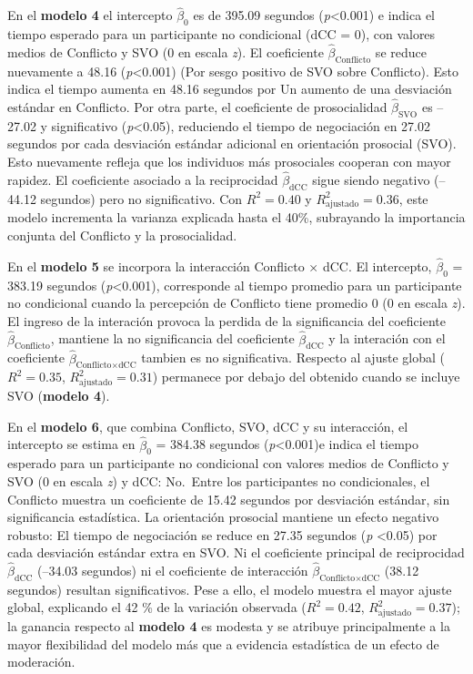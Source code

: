 \documentclass[
  spanish,
  10pt,
]{article}
\begin{document}
En el \textbf{modelo 4} el intercepto \(\hat{\beta}_0\) es de 395.09
segundos (\emph{p}\textless0.001) e indica el tiempo esperado para un
participante no condicional (dCC = 0), con valores medios de Conflicto y
SVO (0 en escala \emph{z}). El coeficiente
\(\hat{\beta}_{\text{Conflicto}}\) se reduce nuevamente a 48.16
(\emph{p}\textless0.001) (Por sesgo positivo de SVO sobre Conflicto).
Esto indica el tiempo aumenta en 48.16 segundos por Un aumento de una
desviación estándar en Conflicto. Por otra parte, el coeficiente de
prosocialidad \(\hat{\beta}_{\text{SVO}}\) es --27.02 y significativo
(\emph{p}\textless0.05), reduciendo el tiempo de negociación en 27.02
segundos por cada desviación estándar adicional en orientación prosocial
(SVO). Esto nuevamente refleja que los individuos más prosociales
cooperan con mayor rapidez. El coeficiente asociado a la reciprocidad
\(\hat{\beta}_{\text{dCC}}\) sigue siendo negativo (--44.12 segundos)
pero no significativo. Con \(R^2 = 0.40\) y
\(R^2_{\text{ajustado}} = 0.36\), este modelo incrementa la varianza
explicada hasta el 40\%, subrayando la importancia conjunta del
Conflicto y la prosocialidad.

En el \textbf{modelo 5} se incorpora la interacción Conflicto × dCC. El
intercepto, \(\hat{\beta}_0\) = 383.19 segundos
(\emph{p}\textless0.001), corresponde al tiempo promedio para un
participante no condicional cuando la percepción de Conflicto tiene
promedio 0 (0 en escala \emph{z}). El ingreso de la interación provoca
la perdida de la significancia del coeficiente
\(\hat{\beta}_{\text{Conflicto}}\), mantiene la no significancia del
coeficiente \(\hat{\beta}_{\text{dCC}}\) y la interación con el
coeficiente \(\hat{\beta}_{\text{Conflicto} \times \text{dCC}}\) tambien
es no significativa. Respecto al ajuste global (\(R^2 = 0.35\),
\(R^2_{\text{ajustado}} = 0.31\)) permanece por debajo del obtenido
cuando se incluye SVO (\textbf{modelo 4}).

En el \textbf{modelo 6}, que combina Conflicto, SVO, dCC y su
interacción, el intercepto se estima en \(\hat{\beta}_0\) = 384.38
segundos (\emph{p}\textless0.001)e indica el tiempo esperado para un
participante no condicional con valores medios de Conflicto y SVO (0 en
escala \emph{z}) y dCC: No.~Entre los participantes no condicionales, el
Conflicto muestra un coeficiente de 15.42 segundos por desviación
estándar, sin significancia estadística. La orientación prosocial
mantiene un efecto negativo robusto: El tiempo de negociación se reduce
en 27.35 segundos (\emph{p} \textless0.05) por cada desviación estándar
extra en SVO. Ni el coeficiente principal de reciprocidad
\(\hat\beta_{\text{dCC}}\) (--34.03 segundos) ni el coeficiente de
interacción \(\hat{\beta}_{\text{Conflicto} \times \text{dCC}}\) (38.12
segundos) resultan significativos. Pese a ello, el modelo muestra el
mayor ajuste global, explicando el 42 \% de la variación observada
(\(R^2 = 0.42\), \(R^2_{\text{ajustado}} = 0.37\)); la ganancia respecto
al \textbf{modelo 4} es modesta y se atribuye principalmente a la mayor
flexibilidad del modelo más que a evidencia estadística de un efecto de
moderación.
\end{document}
